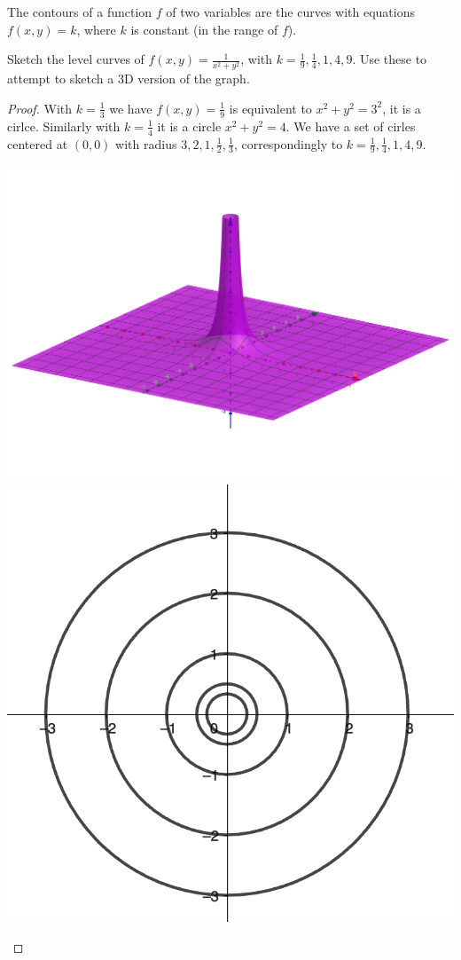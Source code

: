 \begin{definition} The contours of a function $f$ of two variables are the curves with equations $f(x,y) = k$, where $k$ is constant (in the range of $f$).
\end{definition}

\begin{example} Sketch the level curves of $f(x,y) = \frac{1}{x^2+y^2}$, with $k=\frac{1}{9}, \frac{1}{4}, 1, 4, 9$. Use these to attempt to sketch a 3D version of the graph.
\end{example}
\begin{proof} With $k=\frac{1}{3}$ we have $f(x,y) = \frac{1}{9}$ is equivalent to $x^2+y^2 = 3^2$, it is a cirlce. Similarly with $k=\frac{1}{4}$ it is a circle $x^2+y^2=4$. We have a set of cirles centered at $(0,0)$ with radius $3,2,1,\frac{1}{2}, \frac{1}{3}$, correspondingly to $k=\frac{1}{9}, \frac{1}{4}, 1, 4, 9$.
\clearpage
\begin{center}
    \includegraphics[scale=0.1]{images/11-ex2-a.png} \quad 
    \includegraphics[scale=0.5]{images/11-ex2-b.png}    

\end{center}
\end{proof}
